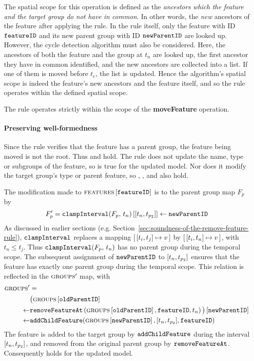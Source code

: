    The spatial scope for this operation is defined as the \emph{ancestors which the feature and the target group do not have in common}. In other words, the \emph{new} ancestors of the feature after applying the rule. In the rule itself, only the feature with ID $\texttt{featureID}$ and its new parent group with ID $\texttt{newParentID}$ are looked up. However, the cycle detection algorithm must also be considered. Here, the ancestors of both the feature and the group at $t_n$ are looked up, the first ancestor they have in common identified, and the new ancestors are collected into a list. If one of them is moved before $t_e$, the list is updated. Hence the algorithm's spatial scope is indeed the feature's new ancestors and the feature itself, and so the rule operates within the defined spatial scope.
\\

\begin{lemma}
   The  rule operates strictly within the scope of the \textbf{moveFeature} operation.
   \label{lemma:move-feature-scope}
\end{lemma}

\paragraph{Preserving well-formedness}
Since the rule verifies that the feature has a parent group, the feature being moved is not the root. Thus  and  hold. The rule does not update the name, type or subgroups of the feature, so  is true for the updated model. Nor does it modify the target group's type or parent feature, so , , and  also hold.

The modification made to $\textsc{features} \left[ \texttt{featureID} \right]$ is to the parent group map $F_p$ by 
\[
   F_p' = \lookup{\var{clampInterval}(F_p, \, t_n)}{\interval{t_n}{t_{p_2}}} \assign \var{newParentID}
\]
As discussed in earlier sections (e.g. Section~\vref{sec:soundness-of-the-remove-feature-rule}), $\texttt{clampInterval}$ replaces a mapping $\intervalmapping{t_i}{t_j}{v}$ by $\intervalmapping{t_i}{t_n}{v}$, with $t_n \leq t_j$. Thus $\texttt{clampInterval}(F_p, \, t_n)$ has no parent group during the temporal scope. The subsequent assignment of $\texttt{newParentID}$ to $\interval{t_n}{t_{p_2}}$ ensures that the feature has exactly one parent group during the temporal scope. This relation is reflected in the $\textsc{groups}{}{}'$ map, with
\begin{align*}
   \groups' &= \\
   \lookup{&\big(\lookup{\groups{}}{\var{oldParentID}} \\
   \assign & \var{removeFeatureAt}\left(\lookup{\groups{}}{\var{oldParentID}}, \var{featureID}, t_n\right)\big)}{\var{newParentID}} \\
   \assign& \var{addChildFeature}(\lookup{\groups{}}{\var{newParentID}}, \interval{t_n}{t_{p_2}}, \var{featureID})
\end{align*}
The feature is added to the target group by $\texttt{addChildFeature}$ during the interval $\interval{t_n}{t_{p_2}}$, and removed from the original parent group by $\texttt{removeFeatureAt}$. Consequently  holds for the updated model. 

